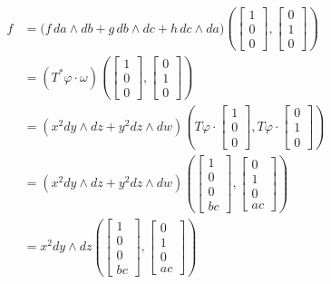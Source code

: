 \begin{align*}
f&=\bigl(f\,da\wedge db+g\,db\wedge dc+h\,dc\wedge da\bigr)\left(\begin{bmatrix}1\\0\\0\end{bmatrix},\begin{bmatrix}0\\1\\0\end{bmatrix}\right)\\
&=(T^*\varphi\cdot\omega)\left(\begin{bmatrix}1\\0\\0\end{bmatrix},\begin{bmatrix}0\\1\\0\end{bmatrix}\right)\\
&=\left(x^2dy\wedge dz+y^2dz\wedge dw\right)\left(T\varphi\cdot\begin{bmatrix}1\\0\\0\end{bmatrix},T\varphi\cdot\begin{bmatrix}0\\1\\0\end{bmatrix}\right)\\
&=\left(x^2dy\wedge dz+y^2dz\wedge dw\right)\left(\begin{bmatrix}1\\0\\0\\bc\end{bmatrix},\begin{bmatrix}0\\1\\0\\ac\end{bmatrix}\right)\\
&=x^2dy\wedge dz\left(\begin{bmatrix}1\\0\\0\\bc\end{bmatrix},\begin{bmatrix}0\\1\\0\\ac\end{bmatrix}\right)

\end{align*}
